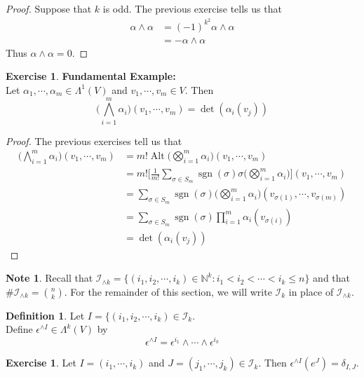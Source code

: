 \documentclass{book}
\theoremstyle{definition}
\newtheorem{defn}[definition]{Definition}
\newtheorem{note}[definition]{Note}
\newtheorem{ex}[definition]{Exercise}
\newcommand{\al}{\alpha}
\newcommand{\del}{\delta}
\newcommand{\ep}{\epsilon}
\newcommand{\sig}{\sigma}
\newcommand{\Lam}{\Lambda}
\newcommand{\N}{\mathbb{N}}
\newcommand{\MI}{\mathcal{I}}
\DeclareMathOperator{\sgn}{sgn}
\DeclareMathOperator{\Alt}{Alt}
\DeclareMathOperator*{\0}{\mbf{0}}
\DeclareMathOperator*{\1}{\mbf{1}}
\begin{document}
	\begin{proof}
		Suppose that $k$ is odd. The previous exercise tells us that 
		\begin{align*}
			\al \wedge \al 
			&= (-1)^{k^2} \al \wedge \al \\
			&= -\al \wedge \al
		\end{align*}
		Thus $\al \wedge \al = 0$.
	\end{proof}
	
	\begin{ex}\textbf{Fundamental Example:}\\
		Let $\al_1, \cdots, \al_m \in \Lam^1(V)$ and $v_1, \cdots, v_m \in V$. Then $$\bigg( \bigwedge_{i=1}^m \al_i \bigg)(v_1, \cdots, v_m) = \det (\al_i (v_j))$$
	\end{ex}

	\begin{proof}
		The previous exercises tell us that
		\begin{align*}
			\bigg( \bigwedge_{i=1}^m \al_i \bigg)(v_1, \cdots, v_m)
			&= m! \Alt \bigg( \bigotimes_{i=1}^m \al_i \bigg) (v_1, \cdots, v_m) \\
			&= m! \bigg[ \frac{1}{m!} \sum_{\sig \in S_{m}} \sgn(\sig) \sig \bigg(\bigotimes_{i=1}^m \al_i \bigg) \bigg] (v_1, \cdots, v_m) \\
			&= \sum_{\sig \in S_{m}} \sgn(\sig)  \bigg(\bigotimes_{i=1}^m \al_i \bigg) (v_{\sig(1)}, \cdots, v_{\sig(m)}) \\
			&= \sum_{\sig \in S_{m}} \sgn(\sig)  \prod_{i=1}^m \al_i(v_{\sig(i)})   \\
			&= \det (\al_i (v_j))
		\end{align*}
	\end{proof}

	\begin{note}
		Recall that $\MI_{\wedge k} = \{(i_1, i_2, \cdots, i_k) \in \N^k: i_1 < i_2 < \cdots < i_k \leq n \}$ and that $\# \MI_{\wedge k} = {n \choose k}$. For the remainder of this section, we will write $\MI_k$ in place of $\MI_{\wedge k}$.
	\end{note}

	\begin{defn}
		Let $I = \{(i_1, i_2, \cdots, i_k) \in \MI_k$. \\ Define $\ep^{\wedge I} \in \Lam^k(V)$ by $$ \ep^{\wedge I} = \ep^{i_1} \wedge \cdots \wedge \ep^{i_k} $$ 
	\end{defn}

	\begin{ex}
		Let $I = (i_1, \cdots, i_k)$ and $J = (j_1, \cdots, j_k) \in \MI_k$. Then $\ep^{\wedge I} (e^J) = \del_{I,J}$.
	\end{ex}
\end{document}
